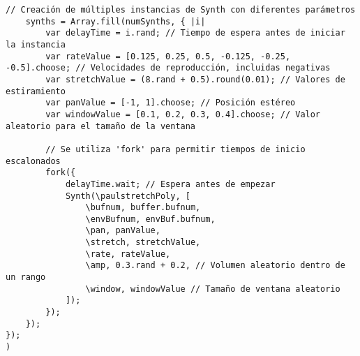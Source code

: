 \begin{minipage}[t]{1\textwidth}
\begin{lstlisting}[style=SuperCollider-IDE, basicstyle=\footnotesize\ttfamily, numbers=none]
    // Creación de múltiples instancias de Synth con diferentes parámetros
    synths = Array.fill(numSynths, { |i|
        var delayTime = i.rand; // Tiempo de espera antes de iniciar la instancia
        var rateValue = [0.125, 0.25, 0.5, -0.125, -0.25, -0.5].choose; // Velocidades de reproducción, incluidas negativas
        var stretchValue = (8.rand + 0.5).round(0.01); // Valores de estiramiento
        var panValue = [-1, 1].choose; // Posición estéreo
        var windowValue = [0.1, 0.2, 0.3, 0.4].choose; // Valor aleatorio para el tamaño de la ventana

        // Se utiliza 'fork' para permitir tiempos de inicio escalonados
        fork({
            delayTime.wait; // Espera antes de empezar
            Synth(\paulstretchPoly, [
                \bufnum, buffer.bufnum,
                \envBufnum, envBuf.bufnum,
                \pan, panValue,
                \stretch, stretchValue,
                \rate, rateValue,
                \amp, 0.3.rand + 0.2, // Volumen aleatorio dentro de un rango
                \window, windowValue // Tamaño de ventana aleatorio
            ]);
        });
    });
});
)                                 
    \end{lstlisting}
    \vspace{1cm}
\end{minipage}



















